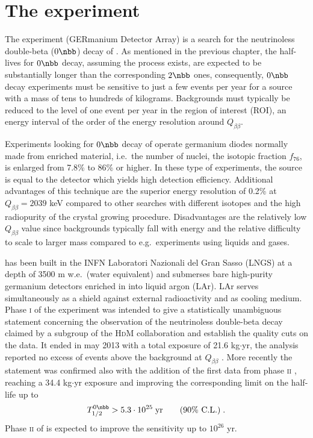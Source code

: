 \section{The {\gerda} experiment}
The {\gerda} experiment (GERmanium Detector Array) is a search for the neutrinoless double-beta ($0\nbb$) decay of . As mentioned in the previous chapter, the half-lives for $0\nbb$ decay, assuming the process exists, are expected to be substantially longer than the corresponding $2\nbb$ ones, consequently, $0\nbb$ decay experiments must be sensitive to just a few events per year for a source with a mass of tens to hundreds of kilograms. Backgrounds must typically be reduced to the level of one event per year in the region of interest (ROI), an energy interval of the order of the energy resolution around $Q_{\beta\beta}$. 

Experiments looking for $0\nbb$ decay of  operate germanium diodes normally made from enriched material, i.e.~the number of  nuclei, the isotopic fraction $f_{76}$, is enlarged from 7.8\% to 86\% or higher. In these type of experiments, the source is equal to the detector which yields high detection efficiency. Additional advantages of this technique are the superior energy resolution of 0.2\% at $Q_{\beta\beta}=2039$ keV compared to other searches with different isotopes and the high radiopurity of the crystal growing procedure. Disadvantages are the relatively low $Q_{\beta\beta}$ value since backgrounds typically fall with energy and the relative difficulty to scale to larger mass compared to e.g.~experiments using liquids and gases.

{\gerda} has been built in the INFN Laboratori Nazionali del Gran Sasso (LNGS) at a depth of 3500 m w.e.~(water equivalent) and submerses bare high-purity germanium detectors enriched in  into liquid argon (LAr). LAr serves simultaneously as a shield against external radioactivity and as cooling medium. Phase \textsc{i} of the experiment was intended to give a statistically unambiguous statement concerning the observation of the neutrinoless double-beta decay claimed by a subgroup of the \textsc{HdM} collaboration \cite{hdmclaim} and establish the quality cuts on the data. It ended in may 2013 with a total exposure of 21.6 kg$\cdot$yr, the analysis reported no excess of events above the background at $Q_{\beta\beta}$ \cite{resultsphase1}. More recently the statement was confirmed also with the addition of the first data from phase \textsc{ii} \cite{nature}, reaching a 34.4 kg$\cdot$yr exposure and improving the corresponding limit on the half-life up to
\[T_{1/2}^{0\nbb}>5.3\cdot10^{25}\;\text{yr}\qquad\text{(90\% C.L.)}\;.\]
Phase \textsc{ii} of {\gerda} is expected to improve the sensitivity up to $10^{26}$ yr.

